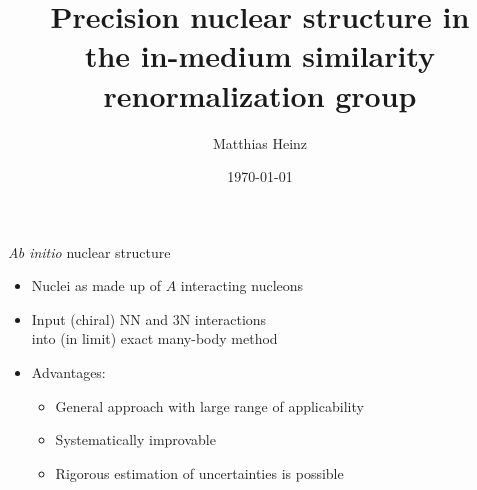 \documentclass{beamer}
\title{
  Precision nuclear structure in \\
  the in-medium similarity renormalization group
}
\date{\today}
\author{Matthias Heinz}
\institute{Institut f\"ur Kernphysik, TU Darmstadt}
\begin{document}

  \maketitle


  \begin{frame}{\textit{Ab initio} nuclear structure}
    \begin{itemize}
      \item{Nuclei as made up of $A$ interacting nucleons}
      \item{Input (chiral) NN and 3N interactions \\ into (in limit) exact many-body method}
      \item{Advantages:}
      \begin{itemize}
        \item{General approach with large range of applicability}
        \item{Systematically improvable}
        \item{Rigorous estimation of uncertainties is possible}
      \end{itemize}
    \end{itemize}
  \end{frame}
\end{document}
